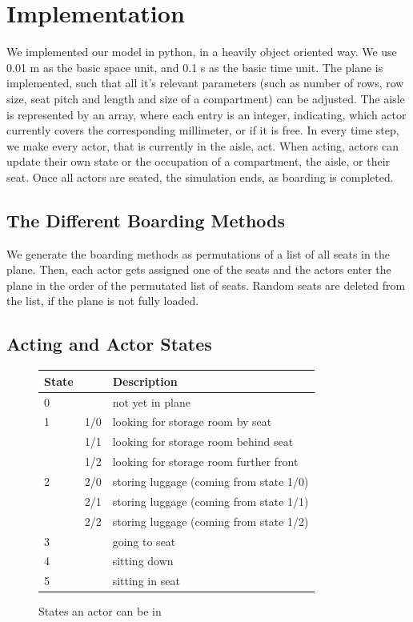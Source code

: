 \documentclass[11pt]{article}
\begin{document}
\section{Implementation}

We implemented our model in python, in a heavily object oriented way. We use 0.01 m as the basic space unit, and 0.1 s as the basic time unit. The plane is implemented, such that all it's relevant parameters (such as number of rows, row size, seat pitch and length and size of a compartment) can be adjusted. The aisle is represented by an array, where each entry is an integer, indicating, which actor currently covers the corresponding millimeter, or if it is free. In every time step, we make every actor, that is currently in the aisle, act. When acting, actors can update their own state or the occupation of a compartment, the aisle, or their seat. Once  all actors are seated, the simulation ends, as boarding is completed.

\subsection{The Different Boarding Methods}
We generate the boarding methods as permutations of a list of all seats in the plane. Then, each actor gets assigned one of the seats and the actors enter the plane in the order of the permutated list of seats. Random seats are deleted from the list, if the plane is not fully loaded.

\subsection{Acting and Actor States}
\begin{figure}[h!]
	\center
\begin{tabular}{|ll|l|}
	\hline
	State & &Description\\
	\hline
0 &     & not yet in plane                        \\
\hline
1 & 1/0 & looking for storage room by seat        \\
  & 1/1 & looking for storage room behind seat    \\
  & 1/2 & looking for storage room further front  \\
  \hline
2 & 2/0 & storing luggage (coming from state 1/0) \\
  & 2/1 & storing luggage (coming from state 1/1) \\
  & 2/2 & storing luggage (coming from state 1/2) \\
  \hline
3 &     & going to seat                           \\
\hline
4 &     & sitting down                            \\
\hline
5 &     & sitting in seat       \\                 
\hline

\end{tabular}
\caption{States an actor can be in}
\label{tab:states}
\end{figure}
\end{document}
